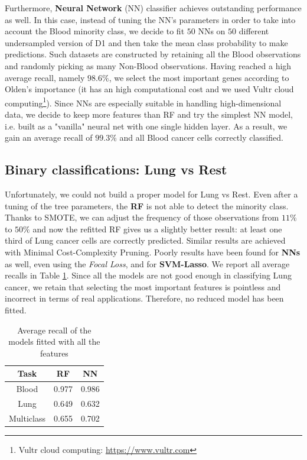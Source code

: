 \documentclass[a4paper,11pt, oneside]{article}  %
\begin{document}
Furthermore,  \textbf{Neural Network} (NN) classifier achieves outstanding performance as well.  In this case,  instead of tuning the NN's parameters in order to take into account the Blood minority class,  we decide to fit $50$ NNs on $50$ different undersampled version of D1 and then take the mean class probability to make predictions.  Such datasets are constructed by retaining all the Blood observations and randomly picking as many Non-Blood observations.  Having reached a high average recall,  namely $98.6\%$,  we select the most important genes according to Olden's importance (it has an high computational cost and we used Vultr cloud computing\footnote{Vultr cloud computing: \url{https://www.vultr.com}}). Since NNs are especially suitable in handling high-dimensional data, we decide to keep more features than RF and try the simplest NN model,  i.e.  built as a "vanilla" neural net with one single hidden layer.  As a result, we gain an average recall of $99.3\%$ and all Blood cancer cells correctly classified. 


\subsection{Binary classifications: Lung vs Rest}
Unfortunately,  we could not build a proper model for Lung vs Rest.  Even after a tuning of the tree parameters,  the \textbf{RF} is not able to detect the minority class.  Thanks to SMOTE, we can adjust the frequency of those observations from $11\%$ to $50\%$ and now the refitted RF gives us a slightly better result: at least one third of Lung cancer cells are correctly predicted.  Similar results are achieved with Minimal Cost-Complexity Pruning. Poorly results have been found for \textbf{NNs} as well,  even using the \textit{Focal Loss}, and for \textbf{SVM-Lasso}. We report all average recalls in Table \ref{table:big_models}.  Since all the models are not good enough in classifying Lung cancer, we retain that selecting the most important features is pointless and incorrect in terms of real applications. Therefore, no reduced model has been fitted.



\begin{table}[h!]
 \centering
 \begin{tabular}{c c c}
  \hline\hline
  Task & RF & NN \\ [0.5ex] %
  \hline
  Blood & 0.977  & 0.986 \\
  Lung & 0.649  & 0.632 \\
  Multiclass & 0.655 & 0.702 \\ [1ex]
  \hline
 \end{tabular}
 \caption{Average recall of the models fitted with all the features}
 \label{table:big_models}
\end{table}
\end{document}
